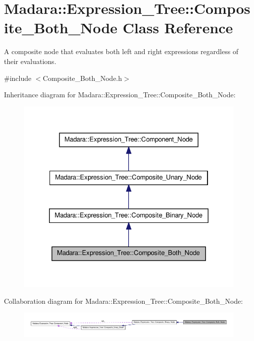 \hypertarget{classMadara_1_1Expression__Tree_1_1Composite__Both__Node}{
\section{Madara::Expression\_\-Tree::Composite\_\-Both\_\-Node Class Reference}
\label{dd/db6/classMadara_1_1Expression__Tree_1_1Composite__Both__Node}
}


A composite node that evaluates both left and right expressions regardless of their evaluations.  




{\ttfamily \#include $<$Composite\_\-Both\_\-Node.h$>$}



Inheritance diagram for Madara::Expression\_\-Tree::Composite\_\-Both\_\-Node:
\nopagebreak
\begin{figure}[H]
\begin{center}
\leavevmode
\includegraphics[width=322pt]{d0/d6f/classMadara_1_1Expression__Tree_1_1Composite__Both__Node__inherit__graph}
\end{center}
\end{figure}


Collaboration diagram for Madara::Expression\_\-Tree::Composite\_\-Both\_\-Node:
\nopagebreak
\begin{figure}[H]
\begin{center}
\leavevmode
\includegraphics[width=400pt]{d1/d75/classMadara_1_1Expression__Tree_1_1Composite__Both__Node__coll__graph}
\end{center}
\end{figure}
